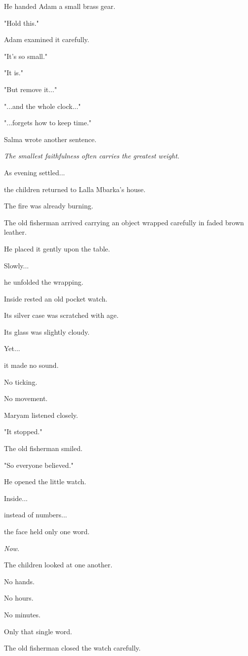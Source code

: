 \documentclass[12pt,openany]{book}
\begin{document}
He handed Adam a small brass gear.

"Hold this."

Adam examined it carefully.

"It's so small."

"It is."

"But remove it..."

"...and the whole clock..."

"...forgets how to keep time."

Salma wrote another sentence.

\emph{The smallest faithfulness often carries the greatest weight.}

As evening settled...

the children returned to Lalla Mbarka's house.

The fire was already burning.

The old fisherman arrived carrying an object wrapped carefully in faded brown leather.

He placed it gently upon the table.

Slowly...

he unfolded the wrapping.

Inside rested an old pocket watch.

Its silver case was scratched with age.

Its glass was slightly cloudy.

Yet...

it made no sound.

No ticking.

No movement.

Maryam listened closely.

"It stopped."

The old fisherman smiled.

"So everyone believed."

He opened the little watch.

Inside...

instead of numbers...

the face held only one word.

\emph{Now.}

The children looked at one another.

No hands.

No hours.

No minutes.

Only that single word.

The old fisherman closed the watch carefully.
\end{document}
